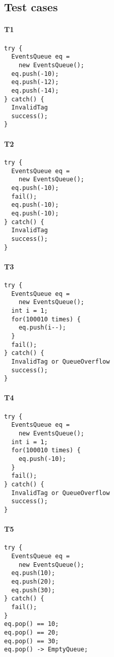 \subsection{Test cases}
\begin{multicols}{2}
\paragraph{T1}
\begin{verbatim}
try {
  EventsQueue eq =
    new EventsQueue();
  eq.push(-10);
  eq.push(-12);
  eq.push(-14);
} catch() {
  InvalidTag
  success();
}
\end{verbatim}

\paragraph{T2}
\begin{verbatim}
try {
  EventsQueue eq =
    new EventsQueue();
  eq.push(-10);
  fail();
  eq.push(-10);
  eq.push(-10);
} catch() {
  InvalidTag
  success();
}
\end{verbatim}

\paragraph{T3}
\begin{verbatim}
try {
  EventsQueue eq =
    new EventsQueue();
  int i = 1;
  for(100010 times) {  
    eq.push(i--);
  }
  fail();
} catch() {
  InvalidTag or QueueOverflow
  success();
}
\end{verbatim}

\bigskip
\paragraph{T4}
\begin{verbatim}
try {
  EventsQueue eq =
    new EventsQueue();
  int i = 1;
  for(100010 times) {  
    eq.push(-10);
  }
  fail();
} catch() {
  InvalidTag or QueueOverflow
  success();
}
\end{verbatim}

\paragraph{T5}
\begin{verbatim}
try {
  EventsQueue eq =
    new EventsQueue();
  eq.push(10);
  eq.push(20);
  eq.push(30);
} catch() {
  fail();
}
eq.pop() == 10;
eq.pop() == 20;
eq.pop() == 30;
eq.pop() -> EmptyQueue;
\end{verbatim}


\end{multicols}
